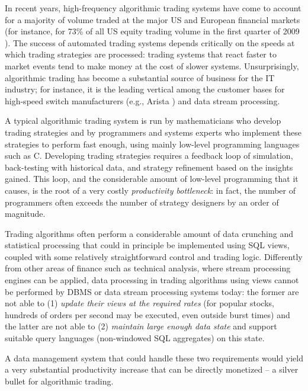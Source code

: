 

In recent years, high-frequency algorithmic trading systems have come to account for a majority
of volume traded at the major US and European financial markets (for instance,
for 73\% of all US equity trading volume in the first quarter of 2009
\cite{Iati2009}). The success of automated trading systems depends critically on
the speeds at which trading strategies are processed: trading systems that react faster to market events
tend to make money at the cost of slower systems. Unsurprisingly, algorithmic
trading has become a substantial source of business for the IT industry; for
instance, it is the leading vertical among the customer bases for high-speed
switch manufacturers (e.g., Arista \cite{Becht2010}) and data stream processing.




A typical algorithmic trading system is run by mathematicians who develop
trading strategies and by programmers and systems experts who implement these
strategies to perform fast enough, using mainly low-level programming languages
such as C. Developing trading strategies requires a feedback loop of simulation,
back-testing with historical data, and strategy refinement based on the insights
gained. This loop, and the considerable amount of low-level programming that it
causes, is the root of a very costly {\em productivity bottleneck}\/: in fact,
the number of programmers often exceeds the number of strategy designers by
an order of magnitude.


Trading algorithms often perform a considerable amount of data crunching
and statistical processing that could in principle be implemented using SQL
views, coupled with some relatively straightforward control and trading logic.
%
Differently from other areas of finance such as technical analysis,
where stream processing engines
\cite{abadi-vldbj:03,motwani-cidr:03} can be applied,
data processing in trading algorithms using views cannot be performed by DBMS or
data stream processing systems today: the former are not able to (1) {\em update
their views at the required rates}\/ (for popular stocks, hundreds of orders per
second may be executed, even outside burst times) and the latter are not able to
(2) {\em maintain large enough data state}\/ and support suitable query
languages (non-windowed SQL aggregates) on this state.

%
A data management system that could handle these two requirements would yield a
very substantial productivity increase that can be directly monetized --
a silver bullet for algorithmic trading.



